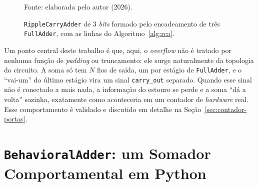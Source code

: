 \begin{figure}[H]
\centering
\caption{\texttt{RippleCarryAdder} de 3 \textit{bits} formado pelo encadeamento de três \texttt{FullAdder}, com as linhas do Algoritmo~\ref{alg:rca}.}
\label{fig:rca}
\begin{center}
\footnotesize Fonte: elaborada pelo autor (2026).
\end{center}
\end{figure}

Um ponto central deste trabalho é que, aqui, o \textit{overflow} não é tratado por nenhuma função de \textit{padding} ou truncamento: ele surge naturalmente da topologia do circuito. A soma só tem $N$ fios de saída, um por estágio de \texttt{FullAdder}, e o ``vai-um'' do último estágio vira um sinal \texttt{carry\_out} separado. Quando esse sinal não é conectado a mais nada, a informação do estouro se perde e a soma ``dá a volta'' sozinha, exatamente como aconteceria em um contador de \textit{hardware} real. Esse comportamento é validado e discutido em detalhe na Seção~\ref{sec:contador-portas}.

\section{\texttt{BehavioralAdder}: um Somador Comportamental em Python}
\label{sec:behavioral-adder}

